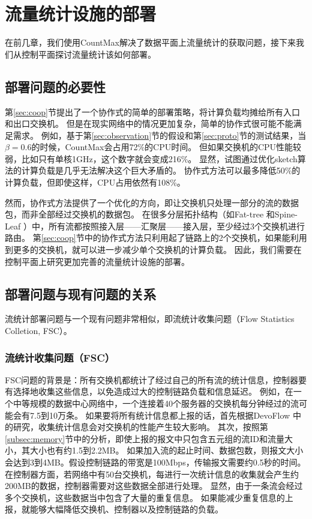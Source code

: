 \chapter{流量统计设施的部署}
在前几章，我们使用CountMax解决了数据平面上流量统计的获取问题，接下来我们从控制平面探讨流量统计该如何部署。

\section{部署问题的必要性}
第\ref{sec:coop}节提出了一个协作式的简单的部署策略，将计算负载均摊给所有入口和出口交换机。
但是在现实网络中的情况更加复杂，简单的协作式很可能不能满足需求。
例如，基于第\ref{sec:observation}节的假设和第\ref{sec:proto}节的测试结果，当$\beta=0.6$的时候，CountMax会占用72\%的CPU时间。
但如果交换机的CPU性能较弱，比如只有单核1GHz，这个数字就会变成216\%。
显然，试图通过优化sketch算法的计算负载是几乎无法解决这个巨大矛盾的。
协作式方法可以最多降低50\%的计算负载，但即使这样，CPU占用依然有108\%。

然而，协作式方法提供了一个优化的方向，即让交换机只处理一部分的流的数据包，而非全部经过交换机的数据包。
在很多分层拓扑结构（如Fat-tree \cite{al2008scalable}和Spine-Leaf \cite{alizadeh2013data}）中，所有流都按照接入层——汇聚层——接入层，至少经过3个交换机进行路由。
第\ref{sec:coop}节中的协作式方法只利用起了链路上的2个交换机，如果能利用到更多的交换机，就可以进一步减少单个交换机的计算负载。
因此，我们需要在控制平面上研究更加完善的流量统计设施的部署。

\section{部署问题与现有问题的关系}
流统计部署问题与一个现有问题非常相似，即流统计收集问题（Flow Statistics Colletion, FSC）。
\subsection{流统计收集问题（FSC）}
FSC问题的背景是：所有交换机都统计了经过自己的所有流的统计信息，控制器要有选择地收集这些信息，以免造成过大的控制链路负载和信息延迟。
例如，在一个中等规模的数据中心网络中\cite{kannan2013compact}，一个连接着40个服务器的交换机每分钟经过的流可能会有7.5到10万条。
如果要将所有统计信息都上报的话，首先根据DevoFlow \cite{curtis2011devoflow}中的研究，收集统计信息会对交换机的性能产生较大影响。
其次，按照第\ref{subsec:memory}节中的分析，即使上报的报文中只包含五元组的流ID和流量大小，其大小也有约1.5到2.2MB。
如果加入流的起止时间、数据包数，则报文大小会达到3到4MB。假设控制链路的带宽是100Mbps，传输报文需要约0.5秒的时间。
在控制器方面，若网络中有50台交换机，每进行一次统计信息的收集就会产生约200MB的数据，控制器需要对这些数据全部进行处理。
显然，由于一条流会经过多个交换机，这些数据当中包含了大量的重复信息。
如果能减少重复信息的上报，就能够大幅降低交换机、控制器以及控制链路的负载。

